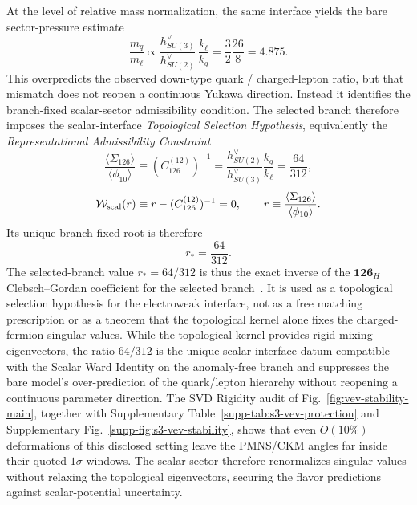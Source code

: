 \documentclass[11pt]{article}
\begin{document}
At the level of relative mass normalization, the same interface yields the bare sector-pressure estimate
\begin{equation}
 \frac{m_q}{m_{\ell}} \propto \frac{h^{\vee}_{SU(3)}}{h^{\vee}_{SU(2)}}\,\frac{k_{\ell}}{k_q}
 = \frac{3}{2}\frac{26}{8}
 = 4.875.
\end{equation}
This overpredicts the observed down-type quark / charged-lepton ratio, but that mismatch does not reopen a continuous Yukawa direction. Instead it identifies the branch-fixed scalar-sector admissibility condition. The selected branch therefore imposes the scalar-interface \emph{Topological Selection Hypothesis}, equivalently the \emph{Representational Admissibility Constraint}
\begin{equation}
 \frac{\langle\Sigma_{126}\rangle}{\langle\phi_{10}\rangle}
 \equiv
 (C_{126}^{(12)})^{-1}
 =
 \frac{h^{\vee}_{SU(2)}}{h^{\vee}_{SU(3)}}\frac{k_q}{k_{\ell}}
 =
 \frac{64}{312},
\end{equation}
\begin{equation}
 \mathcal W_{\rm scal}(r)
 \equiv
 r-(C_{126}^{(12)})^{-1}
 =
 0,
 \qquad
 r\equiv\frac{\langle\Sigma_{126}\rangle}{\langle\phi_{10}\rangle}.
\end{equation}
Its unique branch-fixed root is therefore
\begin{equation}
 r_*=\frac{64}{312}.
\end{equation}
The selected-branch value $r_*=64/312$ is thus the exact inverse of the $\mathbf{126}_H$ Clebsch--Gordan coefficient for the selected branch~\cite{georgi1979,babu1993}. It is used as a topological selection hypothesis for the electroweak interface, not as a free matching prescription or as a theorem that the topological kernel alone fixes the charged-fermion singular values. While the topological kernel provides rigid mixing eigenvectors, the ratio $64/312$ is the unique scalar-interface datum compatible with the Scalar Ward Identity on the anomaly-free branch and suppresses the bare model's over-prediction of the quark/lepton hierarchy without reopening a continuous parameter direction. The SVD Rigidity audit of Fig.~\ref{fig:vev-stability-main}, together with Supplementary Table~\ref{supp-tab:s3-vev-protection} and Supplementary Fig.~\ref{supp-fig:s3-vev-stability}, shows that even $O(10\%)$ deformations of this disclosed setting leave the PMNS/CKM angles far inside their quoted $1\sigma$ windows. The scalar sector therefore renormalizes singular values without relaxing the topological eigenvectors, securing the flavor predictions against scalar-potential uncertainty.
\end{document}
